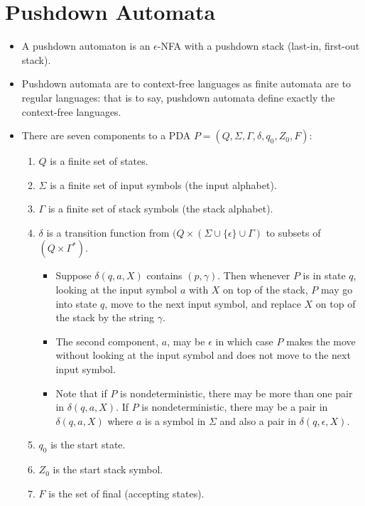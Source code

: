\documentclass[]{article}
\begin{document}
\section{Pushdown Automata}
  \begin{itemize}
    \item A pushdown automaton is an $\epsilon$-NFA with a pushdown stack 
    (last-in, first-out stack).
    \item Pushdown automata are to context-free languages as finite automata are
    to regular languages: that is to say, pushdown automata define exactly the
    context-free languages.
    \item There are seven components to a PDA $P = (Q,\Sigma,\Gamma,
    \delta,q_0,Z_0,F)$:
      \begin{enumerate}
        \item $Q$ is a finite set of states.
        \item $\Sigma$ is a finite set of input symbols (the input alphabet).
        \item $\Gamma$ is a finite set of stack symbols (the stack alphabet).
        \item $\delta$ is a transition function from $(Q \times (\Sigma \cup 
        \{ \epsilon \} \cup \Gamma)$ to subsets of $(Q \times \Gamma^*)$.
          \begin{itemize}
            \item Suppose $\delta(q, a, X)$ contains $(p, \gamma)$. Then 
            whenever $P$ is in state $q$, looking at the input symbol $a$ with 
            $X$ on top of the stack, $P$ may go into state $q$, move to the next 
            input symbol, and replace $X$ on top of the stack by the string $
            \gamma$.
            \item The second component, $a$, may be $\epsilon$ in which case $P$
            makes the move without looking at the input symbol and does not move 
            to the next input symbol.
            \item Note that if $P$ is nondeterministic, there may be more than 
            one pair in $\delta(q,a,X)$. If $P$ is nondeterministic, there may 
            be a pair in $\delta(q,a,X)$ where $a$ is a symbol in $\Sigma$ and 
            also a pair in $\delta(q,\epsilon,X)$.
          \end{itemize}
        \item $q_0$ is the start state.
        \item $Z_0$ is the start stack symbol.
        \item $F$ is the set of final (accepting states).
      \end{enumerate}
  \end{itemize}
\end{document}
